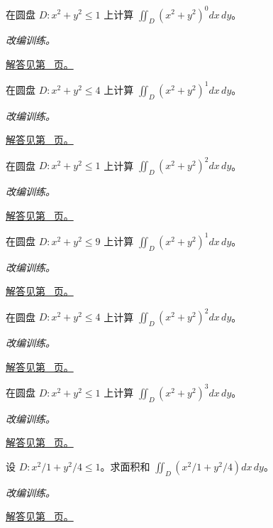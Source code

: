 \documentclass[12pt,fontset=fandol]{ctexart}
\begin{document}
\begin{example}[圆盘上的径向函数]\label{ex:c36q14}
在圆盘 $D:x^2+y^2\le 1$ 上计算 $\displaystyle\iint_D(x^2+y^2)^{0}dx\,dy$。
\par\textit{改编训练。}\par\hyperref[ans:c36q14]{解答见第~\pageref{ans:c36q14} 页。}
\end{example}
\begin{example}[圆盘上的径向函数]\label{ex:c36q15}
在圆盘 $D:x^2+y^2\le 4$ 上计算 $\displaystyle\iint_D(x^2+y^2)^{1}dx\,dy$。
\par\textit{改编训练。}\par\hyperref[ans:c36q15]{解答见第~\pageref{ans:c36q15} 页。}
\end{example}
\begin{example}[圆盘上的径向函数]\label{ex:c36q16}
在圆盘 $D:x^2+y^2\le 1$ 上计算 $\displaystyle\iint_D(x^2+y^2)^{2}dx\,dy$。
\par\textit{改编训练。}\par\hyperref[ans:c36q16]{解答见第~\pageref{ans:c36q16} 页。}
\end{example}
\begin{example}[圆盘上的径向函数]\label{ex:c36q17}
在圆盘 $D:x^2+y^2\le 9$ 上计算 $\displaystyle\iint_D(x^2+y^2)^{1}dx\,dy$。
\par\textit{改编训练。}\par\hyperref[ans:c36q17]{解答见第~\pageref{ans:c36q17} 页。}
\end{example}
\begin{example}[圆盘上的径向函数]\label{ex:c36q18}
在圆盘 $D:x^2+y^2\le 4$ 上计算 $\displaystyle\iint_D(x^2+y^2)^{2}dx\,dy$。
\par\textit{改编训练。}\par\hyperref[ans:c36q18]{解答见第~\pageref{ans:c36q18} 页。}
\end{example}
\begin{example}[圆盘上的径向函数]\label{ex:c36q19}
在圆盘 $D:x^2+y^2\le 1$ 上计算 $\displaystyle\iint_D(x^2+y^2)^{3}dx\,dy$。
\par\textit{改编训练。}\par\hyperref[ans:c36q19]{解答见第~\pageref{ans:c36q19} 页。}
\end{example}
\begin{example}[椭圆换元与面积矩]\label{ex:c36q20}
设 $D:x^2/1+y^2/4\le1$。求面积和 $\displaystyle\iint_D(x^2/1+y^2/4)dx\,dy$。
\par\textit{改编训练。}\par\hyperref[ans:c36q20]{解答见第~\pageref{ans:c36q20} 页。}
\end{example}
\end{document}
